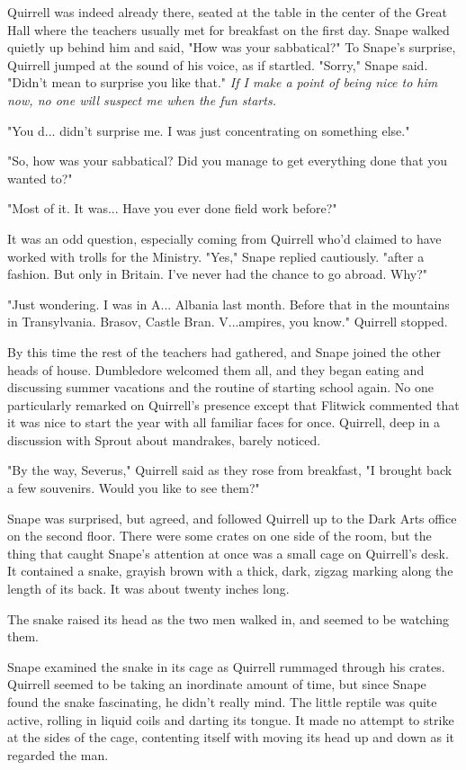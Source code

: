 \documentclass[a4paper,11pt]{article}
\begin{document}
Quirrell was indeed already there, seated at the table in the center of the Great Hall where the teachers usually met for breakfast on the first day. Snape walked quietly up behind him and said, "How was your sabbatical?" To Snape's surprise, Quirrell jumped at the sound of his voice, as if startled. "Sorry," Snape said. "Didn't mean to surprise you like that." \emph{If I make a point of being nice to him now, no one will suspect me when the fun starts.}

"You d... didn't surprise me. I was just concentrating on something else."

"So, how was your sabbatical? Did you manage to get everything done that you wanted to?"

"Most of it. It was... Have you ever done field work before?"

It was an odd question, especially coming from Quirrell who'd claimed to have worked with trolls for the Ministry. "Yes," Snape replied cautiously. "after a fashion. But only in Britain. I've never had the chance to go abroad. Why?"

"Just wondering. I was in A... Albania last month. Before that in the mountains in Transylvania. Brasov, Castle Bran. V...ampires, you know." Quirrell stopped.

By this time the rest of the teachers had gathered, and Snape joined the other heads of house. Dumbledore welcomed them all, and they began eating and discussing summer vacations and the routine of starting school again. No one particularly remarked on Quirrell's presence except that Flitwick commented that it was nice to start the year with all familiar faces for once. Quirrell, deep in a discussion with Sprout about mandrakes, barely noticed.

"By the way, Severus," Quirrell said as they rose from breakfast, "I brought back a few souvenirs. Would you like to see them?"

Snape was surprised, but agreed, and followed Quirrell up to the Dark Arts office on the second floor. There were some crates on one side of the room, but the thing that caught Snape's attention at once was a small cage on Quirrell's desk. It contained a snake, grayish brown with a thick, dark, zigzag marking along the length of its back. It was about twenty inches long.

The snake raised its head as the two men walked in, and seemed to be watching them.

Snape examined the snake in its cage as Quirrell rummaged through his crates. Quirrell seemed to be taking an inordinate amount of time, but since Snape found the snake fascinating, he didn't really mind. The little reptile was quite active, rolling in liquid coils and darting its tongue. It made no attempt to strike at the sides of the cage, contenting itself with moving its head up and down as it regarded the man.
\end{document}
